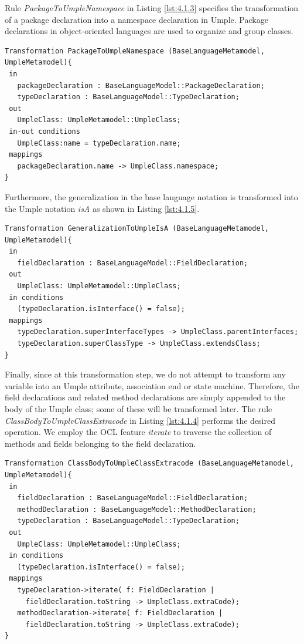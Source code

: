 Rule \textit{PackageToUmpleNamespace} in Listing \ref{lst:4.1.3} specifies the transformation of a package declaration into a namespace declaration in Umple. Package declarations in object-oriented languages are used to organize and group classes.

\begin{lstlisting}[style=mine,caption=Rule PackageToUmpleNamespace,label=lst:4.1.3]
Transformation PackageToUmpleNamespace (BaseLanguageMetamodel, UmpleMetamodel){ 
 in
   packageDeclaration : BaseLanguageModel::PackageDeclaration;
   typeDeclaration : BaseLanguageModel::TypeDeclaration;
 out
   UmpleClass: UmpleMetamodel::UmpleClass;
 in-out conditions
   UmpleClass:name = typeDeclaration.name;
 mappings
   packageDeclaration.name -> UmpleClass.namespace;
}
\end{lstlisting}

Furthermore, the generalization in the base language notation is transformed into the Umple notation \textit{isA} as shown in Listing \ref{lst:4.1.5}.

\begin{lstlisting}[style=mine,caption=Rule GeneralizationToUmpleIsA,label=lst:4.1.5]
Transformation GeneralizationToUmpleIsA (BaseLanguageMetamodel, UmpleMetamodel){ 
 in
   fieldDeclaration : BaseLanguageModel::FieldDeclaration;
 out
   UmpleClass: UmpleMetamodel::UmpleClass;
 in conditions
   (typeDeclaration.isInterface() = false);
 mappings
   typeDeclaration.superInterfaceTypes -> UmpleClass.parentInterfaces;
   typeDeclaration.superClassType -> UmpleClass.extendsClass;
}
\end{lstlisting}

Finally, since at this transformation step, we do not attempt to transform any variable into an Umple attribute, association end or state machine. Therefore, the field declarations and related method declarations are simply appended to the body of the Umple class; some of these will be transformed later. The rule \textit{ClassBodyToUmpleClassExtracode} in Listing \ref{lst:4.1.4} performs the desired operation. We employ the OCL feature \textit{iterate} to traverse the collection of methods and fields belonging to the field declaration. 

\begin{lstlisting}[style=mine,caption=Rule ClassBodyToUmpleClassExtracode,label=lst:4.1.4]
Transformation ClassBodyToUmpleClassExtracode (BaseLanguageMetamodel, UmpleMetamodel){ 
 in
   fieldDeclaration : BaseLanguageModel::FieldDeclaration;
   methodDeclaration : BaseLanguageModel::MethodDeclaration;
   typeDeclaration : BaseLanguageModel::TypeDeclaration;
 out
   UmpleClass: UmpleMetamodel::UmpleClass;
 in conditions
   (typeDeclaration.isInterface() = false);
 mappings
   typeDeclaration->iterate( f: FieldDeclaration | 
     fieldDeclaration.toString -> UmpleClass.extraCode);
   methodDeclaration->iterate( f: FieldDeclaration | 
     fieldDeclaration.toString -> UmpleClass.extraCode);
}
\end{lstlisting}

